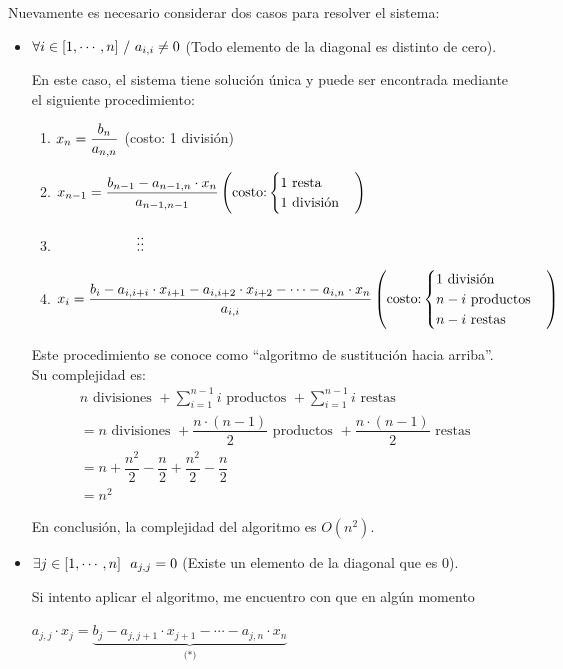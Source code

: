 \documentclass[]{article}
\begin{document}
Nuevamente es necesario considerar dos casos para resolver el sistema:
\begin{itemize}
	\item $\forall i \in [1,\cdots,n]\ /\  a_{i,i}\neq 0$ (Todo elemento de la diagonal es distinto de cero).

	En este caso, el sistema tiene solución única y puede ser encontrada mediante el siguiente procedimiento:
	\begin{enumerate}
		\item $x_n = \displaystyle \frac{b_n}{a_{n,n}} \hfill$ (costo: 1 división)
		\item $x_{n-1} = \displaystyle \frac{b_{n-1} - a_{n-1,n}\cdot x_n}{a_{n-1,n-1}} \hfill \left( \text{costo:} \begin{cases}
			1 \text{ resta}\\
			1 \text{ división}
		\end{cases}\right)$
		\item $\tab \vdots \hfill \vdots \tab \tab \tab \ $
		\item $x_i = \dfrac{b_i-a_{i,i+i}\cdot x_{i+1} - a_{i,i+2}\cdot x_{i+2} - \cdots - a_{i,n}\cdot x_n}{a_{i,i}} \hfill \left(\text{costo:} \begin{cases}
			1 \text{ división}\\
			n-i \text{ productos}\\
			n-i \text{ restas}
		\end{cases}\right)$
	\end{enumerate}

	Este procedimiento se conoce como ``algoritmo de sustitución hacia arriba''. Su complejidad es:
	\begin{align*}
		&n \text{ divisiones } + \displaystyle \sum_{i=1}^{n-1}i \text{ productos } + \displaystyle \sum_{i=1}^{n-1}i \text{ restas }\\
		&= n \text{ divisiones } + \dfrac{n\cdot (n-1)}{2} \text{ productos } + \dfrac{n\cdot (n-1)}{2} \text{ restas }\\
		&= n + \dfrac{n^2}{2} - \dfrac{n}{2} + \dfrac{n^2}{2} - \dfrac{n}{2}\\
		&=n^2
	\end{align*}

	En conclusión, la complejidad del algoritmo es $O(n^2)$.

	\item $\exists j \in [1,\cdots,n]\ \/ \ a_{j,j}=0$ (Existe un elemento de la diagonal que es 0).

	Si intento aplicar el algoritmo, me encuentro con que en algún momento
	\begin{center}
		$a_{j,j}\cdot x_j = \underbrace{b_j - a_{j,j+1}\cdot x_{j+1} - \cdots - a_{j,n}\cdot x_n}_{\text{ (*) }}$
	\end{center}


\end{itemize}
\end{document}
